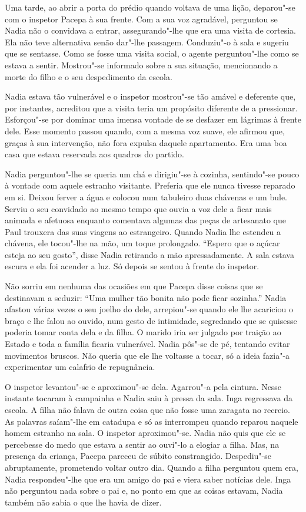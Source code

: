 Uma tarde, ao abrir a porta do prédio quando voltava de uma lição,
deparou"-se com o inspetor Pacepa à sua frente. Com a sua voz agradável,
perguntou se Nadia não o convidava a entrar, assegurando"-lhe que era uma
visita de cortesia. Ela não teve alternativa senão dar"-lhe passagem.
Conduziu"-o à sala e sugeriu que se sentasse. Como se fosse uma visita
social, o agente perguntou"-lhe como se estava a sentir. Mostrou"-se
informado sobre a sua situação, mencionando a morte do filho e o seu
despedimento da escola.

Nadia estava tão vulnerável e o inspetor mostrou"-se tão amável e
deferente que, por instantes, acreditou que a visita teria um propósito
diferente de a pressionar. Esforçou"-se por dominar uma imensa vontade de
se desfazer em lágrimas à frente dele. Esse momento passou quando, com
a mesma voz suave, ele afirmou que, graças à sua intervenção, não fora
expulsa daquele apartamento. Era uma boa casa que estava reservada aos
quadros do partido.

Nadia perguntou"-lhe se queria um chá e dirigiu"-se à cozinha, sentindo"-se
pouco à vontade com aquele estranho visitante. Preferia que ele nunca
tivesse reparado em si. Deixou ferver a água e colocou num tabuleiro
duas chávenas e um bule. Serviu o seu convidado ao mesmo tempo que
ouvia a voz dele a ficar mais animada e afetuosa enquanto comentava
algumas das peças de artesanato que Paul trouxera das suas viagens ao
estrangeiro. Quando Nadia lhe estendeu a chávena, ele tocou"-lhe na mão,
um toque prolongado. ``Espero que o açúcar esteja ao seu gosto'', disse
Nadia retirando a mão apressadamente.
A sala estava escura e ela foi acender a luz. Só depois se sentou à
frente do inspetor.

Não sorriu em nenhuma das ocasiões em que Pacepa disse coisas que se
destinavam a seduzir: ``Uma mulher tão bonita não pode ficar sozinha.''
Nadia afastou várias vezes o seu joelho do dele, arrepiou"-se quando ele
lhe acariciou o braço e lhe falou ao ouvido, num gesto de intimidade, segredando que
se quisesse poderia tomar conta dela e da filha. O marido iria ser
julgado por traição ao Estado e toda a família ficaria vulnerável. Nadia
pôs"-se de pé, tentando evitar movimentos bruscos. Não queria que ele
lhe voltasse a tocar, só a ideia fazia"-a experimentar um calafrio de
repugnância.

O inspetor levantou"-se e aproximou"-se dela. Agarrou"-a pela cintura.
Nesse instante tocaram à campainha e Nadia saiu à pressa da sala. Inga
regressava da escola. A filha não falava de outra coisa que não fosse
uma zaragata no recreio. As palavras saíam"-lhe em catadupa e só as
interrompeu quando reparou naquele homem estranho na sala. O inspetor
aproximou"-se. Nadia não quis que ele se percebesse do medo que estava a
sentir ao ouvi"-lo a elogiar a filha. Mas, na presença da criança, Pacepa
pareceu de súbito constrangido. Despediu"-se abruptamente, prometendo
voltar outro dia. Quando a filha perguntou quem era, Nadia respondeu"-lhe
que era um amigo do pai e viera saber notícias dele. Inga não perguntou
nada sobre o pai e, no ponto em que as coisas estavam, Nadia também não
sabia o que lhe havia de dizer.


